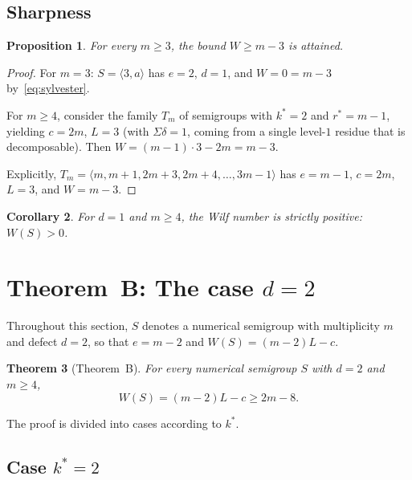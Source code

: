 \documentclass[11pt]{amsart}
\newtheorem{theorem}{Theorem}[section]
\newtheorem{proposition}[theorem]{Proposition}
\newtheorem{corollary}[theorem]{Corollary}
\theoremstyle{definition}
\theoremstyle{remark}
\begin{document}
\subsection{Sharpness}

\begin{proposition}\label{prop:tight-A}
For every $m \ge 3$, the bound $W \ge m - 3$ is attained.
\end{proposition}

\begin{proof}
For $m = 3$: $S = \langle 3, a \rangle$ has $e = 2$, $d = 1$, and $W = 0 = m - 3$
by~\eqref{eq:sylvester}.

For $m \ge 4$, consider the family $T_m$ of semigroups with $k^* = 2$ and
$r^* = m - 1$, yielding $c = 2m$, $L = 3$ (with $\Sigma\delta = 1$, coming
from a single level-$1$ residue that is decomposable).
Then $W = (m-1) \cdot 3 - 2m = m - 3$.

Explicitly, $T_m = \langle m, m+1, 2m+3, 2m+4, \ldots, 3m-1 \rangle$
has $e = m - 1$, $c = 2m$, $L = 3$, and $W = m - 3$.
\end{proof}

\begin{corollary}\label{cor:positive-d1}
For $d = 1$ and $m \ge 4$, the Wilf number is strictly positive: $W(S) > 0$.
\end{corollary}

\section{Theorem~B: The case \texorpdfstring{$d = 2$}{d = 2}}\label{sec:thmB}

Throughout this section, $S$ denotes a numerical semigroup with multiplicity $m$
and defect $d = 2$, so that $e = m - 2$ and
$W(S) = (m - 2)L - c$.

\begin{theorem}[Theorem~B]\label{thm:B}
For every numerical semigroup $S$ with $d = 2$ and $m \ge 4$,
\[
  W(S) = (m - 2) L - c \ge 2m - 8.
\]
\end{theorem}

The proof is divided into cases according to $k^*$.

\subsection{Case $k^* = 2$}
\end{document}
